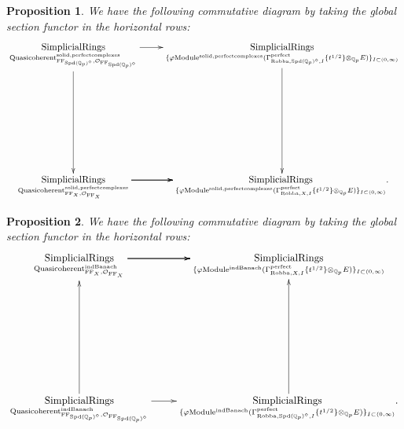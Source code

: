 \documentclass[12pt]{book}
\newtheorem{proposition}{Proposition}
\theoremstyle{definition}
\begin{document}
\begin{proposition}
We have the following commutative diagram by taking the global section functor in the horizontal rows:
\[\displayindent=+0in
\xymatrix@C+0in@R+7pc{
\underset{\mathrm{Quasicoherent}^{\mathrm{solid,perfectcomplexes}}_{\mathrm{FF}_{\mathrm{Spd}(\mathbb{Q}_p)^\diamond},\mathcal{O}_{\mathrm{FF}_{\mathrm{Spd}(\mathbb{Q}_p)^\diamond}}}}{\mathrm{SimplicialRings}}\ar[d] \ar[r] &\underset{\{\varphi\mathrm{Module}^{\mathrm{solid,perfectcomplexes}}(\Gamma^\text{perfect}_{\text{Robba},{\mathrm{Spd}(\mathbb{Q}_p)^\diamond},I}\{t^{1/2}\}\otimes_{\mathbb{Q}_p}E)\}_{I\subset (0,\infty)}}{\mathrm{SimplicialRings}}\ar[d]\\
\underset{\mathrm{Quasicoherent}^{\mathrm{solid,perfectcomplexes}}_{\mathrm{FF}_X,\mathcal{O}_{\mathrm{FF}_X}}}{\mathrm{SimplicialRings}}  \ar[r] \ar[r] \ar[r] &\underset{\{\varphi\mathrm{Module}^{\mathrm{solid,perfectcomplexes}}(\Gamma^\text{perfect}_{\text{Robba},X,I}\{t^{1/2}\}\otimes_{\mathbb{Q}_p}E)\}_{I\subset (0,\infty)}}{\mathrm{SimplicialRings}}.  
}
\]
\end{proposition}

\begin{proposition}
We have the following commutative diagram by taking the global section functor in the horizontal rows:\\
\[\displayindent=+0in
\xymatrix@R+7pc{
\underset{\mathrm{Quasicoherent}^{\mathrm{indBanach}}_{\mathrm{FF}_X,\mathcal{O}_{\mathrm{FF}_X}}}{\mathrm{SimplicialRings}}  \ar[r] \ar[r] \ar[r] &\underset{\{\varphi\mathrm{Module}^{\mathrm{indBanach}}(\Gamma^\text{perfect}_{\text{Robba},X,I}\{t^{1/2}\}\otimes_{\mathbb{Q}_p}E)\}_{I\subset (0,\infty)}}{\mathrm{SimplicialRings}}   \\
\underset{\mathrm{Quasicoherent}^{\mathrm{indBanach}}_{\mathrm{FF}_{\mathrm{Spd}(\mathbb{Q}_p)^\diamond},\mathcal{O}_{\mathrm{FF}_{\mathrm{Spd}(\mathbb{Q}_p)^\diamond}}}}{\mathrm{SimplicialRings}} \ar[u]\ar[r] &\underset{\{\varphi\mathrm{Module}^\text{indBanach}(\Gamma^\text{perfect}_{\text{Robba},{\mathrm{Spd}(\mathbb{Q}_p)^\diamond},I}\{t^{1/2}\}\otimes_{\mathbb{Q}_p}E)\}_{I\subset (0,\infty)}}{\mathrm{SimplicialRings}}.\ar[u]  
}
\]
\end{proposition}
\end{document}
